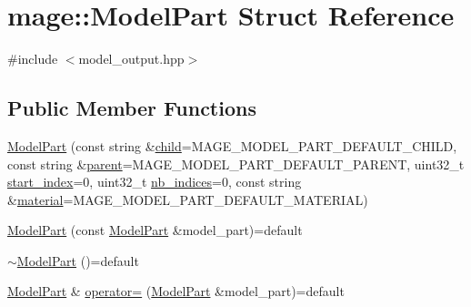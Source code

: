 \hypertarget{structmage_1_1_model_part}{}\section{mage\+:\+:Model\+Part Struct Reference}
\label{structmage_1_1_model_part}


{\ttfamily \#include $<$model\+\_\+output.\+hpp$>$}

\subsection*{Public Member Functions}
\begin{DoxyCompactItemize}
\item 
\hyperlink{structmage_1_1_model_part_a2c0dcbc96147ae6e059c72ca908aeb75}{Model\+Part} (const string \&\hyperlink{structmage_1_1_model_part_a3ab6e2faae44453d60cf0ff4876f49eb}{child}=M\+A\+G\+E\+\_\+\+M\+O\+D\+E\+L\+\_\+\+P\+A\+R\+T\+\_\+\+D\+E\+F\+A\+U\+L\+T\+\_\+\+C\+H\+I\+LD, const string \&\hyperlink{structmage_1_1_model_part_abd5387d6a21aa47bce04565c5333f83e}{parent}=M\+A\+G\+E\+\_\+\+M\+O\+D\+E\+L\+\_\+\+P\+A\+R\+T\+\_\+\+D\+E\+F\+A\+U\+L\+T\+\_\+\+P\+A\+R\+E\+NT, uint32\+\_\+t \hyperlink{structmage_1_1_model_part_af889f5bd847555d544d0ee07187e0115}{start\+\_\+index}=0, uint32\+\_\+t \hyperlink{structmage_1_1_model_part_a4b7d8beddffa117e1f6829e6c9acfce3}{nb\+\_\+indices}=0, const string \&\hyperlink{structmage_1_1_model_part_a4b0bfbb9ac313b6ffe8a8a3ee27469fd}{material}=M\+A\+G\+E\+\_\+\+M\+O\+D\+E\+L\+\_\+\+P\+A\+R\+T\+\_\+\+D\+E\+F\+A\+U\+L\+T\+\_\+\+M\+A\+T\+E\+R\+I\+AL)
\item 
\hyperlink{structmage_1_1_model_part_a3c39c2c312f07687f8ad5c2c2580d1e2}{Model\+Part} (const \hyperlink{structmage_1_1_model_part}{Model\+Part} \&model\+\_\+part)=default
\item 
\hyperlink{structmage_1_1_model_part_a3322c5c7924ec30be170ae1ed6dca550}{$\sim$\+Model\+Part} ()=default
\item 
\hyperlink{structmage_1_1_model_part}{Model\+Part} \& \hyperlink{structmage_1_1_model_part_a00cbb00c174bdd27879b67d54185d748}{operator=} (\hyperlink{structmage_1_1_model_part}{Model\+Part} \&model\+\_\+part)=default
\end{DoxyCompactItemize}
